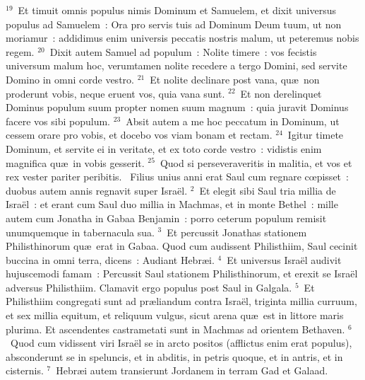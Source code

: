 ${}^{19}$~Et timuit omnis populus nimis Dominum et Samuelem, et dixit universus populus ad Samuelem~: Ora pro servis tuis ad Dominum Deum tuum, ut non moriamur~: addidimus enim universis peccatis nostris malum, ut peteremus nobis regem.
${}^{20}$~Dixit autem Samuel ad populum~: Nolite timere~: vos fecistis universum malum hoc, verumtamen nolite recedere a tergo Domini, sed servite Domino in omni corde vestro.
${}^{21}$~Et nolite declinare post vana, qu\ae\ non proderunt vobis, neque eruent vos, quia vana sunt.
${}^{22}$~Et non derelinquet Dominus populum suum propter nomen suum magnum~: quia juravit Dominus facere vos sibi populum.
${}^{23}$~Absit autem a me hoc peccatum in Dominum, ut cessem orare pro vobis, et docebo vos viam bonam et rectam.
${}^{24}$~Igitur timete Dominum, et servite ei in veritate, et ex toto corde vestro~: vidistis enim magnifica qu\ae\ in vobis gesserit.
${}^{25}$~Quod si perseveraveritis in malitia, et vos et rex vester pariter peribitis.
~Filius unius anni erat Saul cum regnare cœpisset~: duobus autem annis regnavit super Isra\"el.
${}^{2}$~Et elegit sibi Saul tria millia de Isra\"el~: et erant cum Saul duo millia in Machmas, et in monte Bethel~: mille autem cum Jonatha in Gabaa Benjamin~: porro ceterum populum remisit unumquemque in tabernacula sua.
${}^{3}$~Et percussit Jonathas stationem Philisthinorum qu\ae\ erat in Gabaa. Quod cum audissent Philisthiim, Saul cecinit buccina in omni terra, dicens~: Audiant Hebr\ae i.
${}^{4}$~Et universus Isra\"el audivit hujuscemodi famam~: Percussit Saul stationem Philisthinorum, et erexit se Isra\"el adversus Philisthiim. Clamavit ergo populus post Saul in Galgala.
${}^{5}$~Et Philisthiim congregati sunt ad pr\ae liandum contra Isra\"el, triginta millia curruum, et sex millia equitum, et reliquum vulgus, sicut arena qu\ae\ est in littore maris plurima. Et ascendentes castrametati sunt in Machmas ad orientem Bethaven.
${}^{6}$~Quod cum vidissent viri Isra\"el se in arcto positos (afflictus enim erat populus), absconderunt se in speluncis, et in abditis, in petris quoque, et in antris, et in cisternis.
${}^{7}$~Hebr\ae i autem transierunt Jordanem in terram Gad et Galaad.

